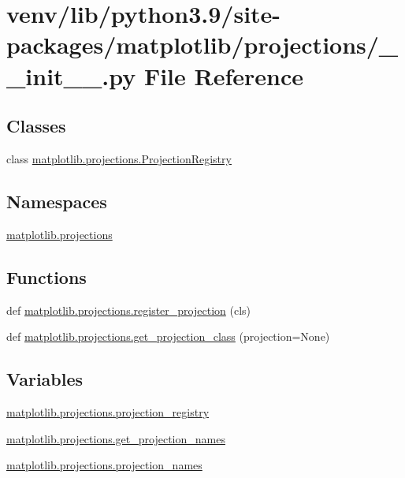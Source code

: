 \hypertarget{venv_2lib_2python3_89_2site-packages_2matplotlib_2projections_2____init_____8py}{}\section{venv/lib/python3.9/site-\/packages/matplotlib/projections/\+\_\+\+\_\+init\+\_\+\+\_\+.py File Reference}
\label{venv_2lib_2python3_89_2site-packages_2matplotlib_2projections_2____init_____8py}
\subsection*{Classes}
\begin{DoxyCompactItemize}
\item 
class \hyperlink{classmatplotlib_1_1projections_1_1ProjectionRegistry}{matplotlib.\+projections.\+Projection\+Registry}
\end{DoxyCompactItemize}
\subsection*{Namespaces}
\begin{DoxyCompactItemize}
\item 
 \hyperlink{namespacematplotlib_1_1projections}{matplotlib.\+projections}
\end{DoxyCompactItemize}
\subsection*{Functions}
\begin{DoxyCompactItemize}
\item 
def \hyperlink{namespacematplotlib_1_1projections_a3d947058fa77a3cfce8e43440c1b02b6}{matplotlib.\+projections.\+register\+\_\+projection} (cls)
\item 
def \hyperlink{namespacematplotlib_1_1projections_a29c83d598d48d870d24adc888d315dbf}{matplotlib.\+projections.\+get\+\_\+projection\+\_\+class} (projection=None)
\end{DoxyCompactItemize}
\subsection*{Variables}
\begin{DoxyCompactItemize}
\item 
\hyperlink{namespacematplotlib_1_1projections_ad9868ec27ca822aab6a06395cb398d0f}{matplotlib.\+projections.\+projection\+\_\+registry}
\item 
\hyperlink{namespacematplotlib_1_1projections_ab0d55b51a11561767d30efbf54c39daf}{matplotlib.\+projections.\+get\+\_\+projection\+\_\+names}
\item 
\hyperlink{namespacematplotlib_1_1projections_a2a31c3c7e1a982837fc5552fd13c5763}{matplotlib.\+projections.\+projection\+\_\+names}
\end{DoxyCompactItemize}
